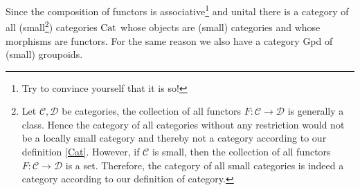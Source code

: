\begin{rem}\label{1CatOfAllCats}
      Since the composition of functors is associative\footnote{Try to convince yourself that it is so!} and unital there is a category of all (small\footnote{Let $\mathscr{C},\mathscr{D}$ be categories, the collection of all functors $F:\mathscr{C}\rightarrow\mathscr{D}$ is generally a class. Hence the category of all categories without any restriction would not be a locally small category and thereby not a category according to our definition \ref{Cat}.  However, if $\mathscr{C}$ is small, then the collection of all functors $F:\mathscr{C}\rightarrow\mathscr{D}$ is a set. Therefore, the category of all small categories is indeed a category according to our definition of category.}) categories $\operatorname{Cat}$ whose objects are (small) categories and whose morphisms are functors. For the same reason we also have a category Gpd of (small) groupoids.
\end{rem}
